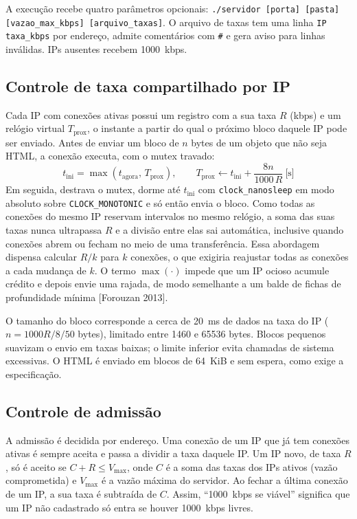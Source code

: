 \documentclass[12pt,a4paper]{article}
\begin{document}
A execução recebe quatro parâmetros opcionais:
\texttt{./servidor [porta] [pasta] [vazao\_max\_kbps] [arquivo\_taxas]}.
O arquivo de taxas tem uma linha \texttt{IP taxa\_kbps} por endereço, admite comentários
com \texttt{\#} e gera aviso para linhas inválidas. IPs ausentes recebem 1000~kbps.

\subsection{Controle de taxa compartilhado por IP}

Cada IP com conexões ativas possui um registro com a sua taxa $R$ (kbps) e um relógio
virtual $T_{\mathrm{prox}}$, o instante a partir do qual o próximo bloco daquele IP pode
ser enviado. Antes de enviar um bloco de $n$ bytes de um objeto que não seja HTML, a
conexão executa, com o mutex travado:
\begin{equation}
t_{\mathrm{ini}} = \max\left(t_{\mathrm{agora}},\, T_{\mathrm{prox}}\right), \qquad
T_{\mathrm{prox}} \leftarrow t_{\mathrm{ini}} + \frac{8n}{1000\,R}\ \text{[s]}
\end{equation}
Em seguida, destrava o mutex, dorme até $t_{\mathrm{ini}}$ com
\texttt{clock\_nanosleep} em modo absoluto sobre \texttt{CLOCK\_MONOTONIC} e só então
envia o bloco. Como todas as conexões do mesmo IP reservam intervalos no mesmo relógio,
a soma das suas taxas nunca ultrapassa $R$ e a divisão entre elas sai automática,
inclusive quando conexões abrem ou fecham no meio de uma transferência. Essa abordagem
dispensa calcular $R/k$ para $k$ conexões, o que exigiria reajustar todas as conexões a
cada mudança de $k$. O termo $\max(\cdot)$ impede que um IP ocioso acumule crédito e
depois envie uma rajada, de modo semelhante a um balde de fichas de profundidade
mínima [Forouzan 2013].

O tamanho do bloco corresponde a cerca de 20~ms de dados na taxa do IP
($n = 1000R/8/50$ bytes), limitado entre 1460 e 65536 bytes. Blocos pequenos suavizam o
envio em taxas baixas; o limite inferior evita chamadas de sistema excessivas. O HTML é
enviado em blocos de 64~KiB e sem espera, como exige a especificação.

\subsection{Controle de admissão}

A admissão é decidida por endereço. Uma conexão de um IP que já tem conexões ativas é
sempre aceita e passa a dividir a taxa daquele IP. Um IP novo, de taxa $R$, só é aceito se
$C + R \le V_{\max}$, onde $C$ é a soma das taxas dos IPs ativos (vazão comprometida) e
$V_{\max}$ é a vazão máxima do servidor. Ao fechar a última conexão de um IP, a sua taxa é
subtraída de $C$. Assim, ``1000~kbps se viável'' significa que um IP não cadastrado só
entra se houver 1000~kbps livres.
\end{document}
